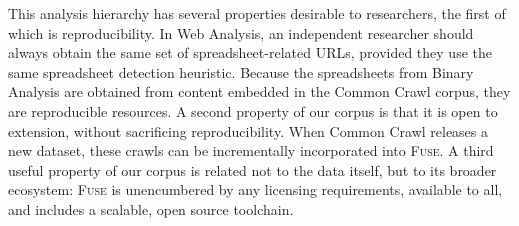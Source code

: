 \documentclass[conference]{IEEEtran}
\begin{document}



This analysis hierarchy has several properties desirable to researchers, the first of which is reproducibility.
In Web Analysis, an independent researcher should always obtain the same set of spreadsheet-related URLs, provided they use the same spreadsheet detection heuristic.
Because the spreadsheets from Binary Analysis are obtained from content embedded in the Common Crawl corpus, they are reproducible resources. A second property of our corpus is that it is open to extension, without sacrificing reproducibility. When Common Crawl releases a new dataset, these crawls can be incrementally incorporated into \textsc{Fuse}. A third useful property of our corpus is related not to the data itself, but to its broader ecosystem: \textsc{Fuse} is unencumbered by any licensing requirements, available to all, and includes a scalable, open source toolchain.




\end{document}
